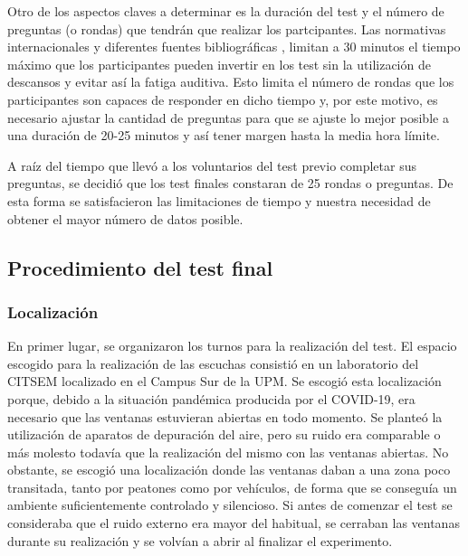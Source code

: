 \documentclass[11pt,a4paper]{book}
\begin{document}
                Otro de los aspectos claves a determinar es la duración del test y el número de preguntas (o rondas) que tendrán que realizar los partcipantes. Las normativas internacionales y diferentes fuentes bibliográficas \cite{UIT1116, UIT1534, UIT1284, EBU3286, UIT1285, UIT1286, ZwickerFactsModels, BlauertSpatialHearing, GelfandStanley}, limitan a 30 minutos el tiempo máximo que los participantes pueden invertir en los test sin la utilización de descansos y evitar así la fatiga auditiva. Esto limita el número de rondas que los participantes son capaces de responder en dicho tiempo y, por este motivo, es necesario ajustar la cantidad de preguntas para que se ajuste lo mejor posible a una duración de 20-25 minutos y así tener margen hasta la media hora límite.
                
                A raíz del tiempo que llevó a los voluntarios del test previo completar sus preguntas, se decidió que los test finales constaran de 25 rondas o preguntas. De esta forma se satisfacieron las limitaciones de tiempo y nuestra necesidad de obtener el mayor número de datos posible.
                
            \subsection{Procedimiento del test final}
        
                \subsubsection*{Localización}
                    En primer lugar, se organizaron los turnos para la realización del test. El espacio escogido para la realización de las escuchas consistió en un laboratorio del CITSEM localizado en el Campus Sur de la UPM. Se escogió esta localización porque, debido a la situación pandémica producida por el COVID-19, era necesario que las ventanas estuvieran abiertas en todo momento. Se planteó la utilización de aparatos de depuración del aire, pero su ruido era comparable o más molesto todavía que la realización del mismo con las ventanas abiertas. No obstante, se escogió una localización donde las ventanas daban a una zona poco transitada, tanto por peatones como por vehículos, de forma que se conseguía un ambiente suficientemente controlado y silencioso. Si antes de comenzar el test se consideraba que el ruido externo era mayor del habitual, se cerraban las ventanas durante su realización y se volvían a abrir al finalizar el experimento.
            
\end{document}
